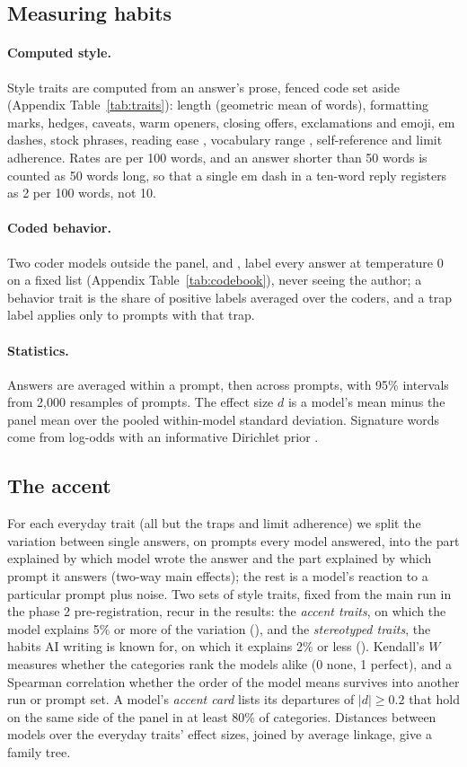\documentclass[11pt]{article}
\begin{document}
\subsection{Measuring habits}
\label{sec:building}
\paragraph{Computed style.}
Style traits are computed from an answer's prose, fenced code set aside (Appendix Table~\ref{tab:traits}): length (geometric mean of words), formatting marks, hedges, caveats, warm openers, closing offers, exclamations and emoji, em dashes, stock phrases, reading ease \citep{flesch1948readability}, vocabulary range \citep{covington2010mattr}, self-reference and limit adherence.
Rates are per 100 words, and an answer shorter than 50 words is counted as 50 words long, so that a single em dash in a ten-word reply registers as 2 per 100 words, not 10.
\paragraph{Coded behavior.}
Two coder models outside the panel, \coderA{} and \coderB{}, label every answer at temperature 0 on a fixed list (Appendix Table~\ref{tab:codebook}), never seeing the author; a behavior trait is the share of positive labels averaged over the coders, and a trap label applies only to prompts with that trap.
\paragraph{Statistics.}
Answers are averaged within a prompt, then across prompts, with 95\% intervals from 2{,}000 resamples of prompts.
The effect size $d$ is a model's mean minus the panel mean over the pooled within-model standard deviation.
Signature words come from log-odds with an informative Dirichlet prior \citep{monroe2008fightin}.

\subsection{The accent}
\label{sec:accent-method}
For each everyday trait (all but the traps and limit adherence) we split the variation between single answers, on prompts every model answered, into the part explained by which model wrote the answer and the part explained by which prompt it answers (two-way main effects); the rest is a model's reaction to a particular prompt plus noise.
Two sets of style traits, fixed from the main run in the phase 2 pre-registration, recur in the results: the \emph{accent traits}, on which the model explains 5\% or more of the variation (\accentSetList), and the \emph{stereotyped traits}, the habits AI writing is known for, on which it explains 2\% or less (\stereoSetList).
Kendall's $W$ measures whether the \nCategories{} categories rank the models alike (0 none, 1 perfect), and a Spearman correlation whether the order of the model means survives into another run or prompt set.
A model's \emph{accent card} lists its departures of $|d|\ge 0.2$ that hold on the same side of the panel in at least 80\% of categories.
Distances between models over the everyday traits' effect sizes, joined by average linkage, give a family tree.
\end{document}
